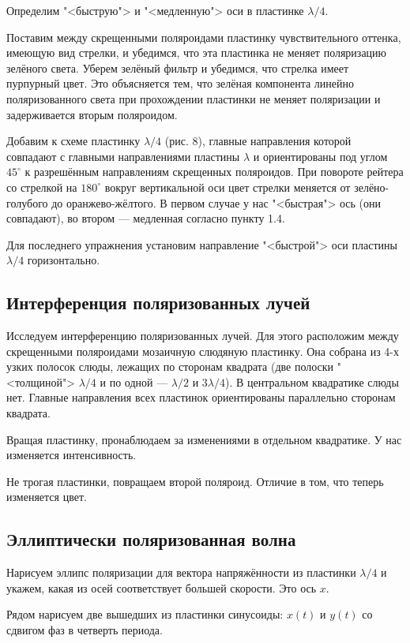 \documentclass[12pt]{kiarticle}
\begin{document}
Определим "<быструю"> и "<медленную"> оси в пластинке $ \lambda/4 $.

Поставим между скрещенными поляроидами пластинку чувствительного оттенка, имеющую вид стрелки, и убедимся, что эта пластинка не меняет поляризацию зелёного света. Уберем зелёный фильтр и убедимся, что стрелка имеет пурпурный
цвет. Это объясняется тем, что зелёная компонента линейно поляризованного света при прохождении пластинки не меняет поляризации и задерживается вторым поляроидом.

Добавим к схеме пластинку $ \lambda/4 $
(рис. 8), главные направления которой совпадают с главными направлениями пластины $ \lambda $ и ориентированы
под углом $ 45^\circ $ к разрешённым направлениям скрещенных поляроидов.
При повороте рейтера со стрелкой на $ 180^\circ $ вокруг вертикальной оси
цвет стрелки меняется от зелёно-голубого до оранжево-жёлтого. В первом случае у нас "<быстрая"> ось (они совпадают), во втором --- медленная согласно пункту 1.4.

Для последнего упражнения установим направление "<быстрой"> оси пластины $ \lambda/4 $ горизонтально.

\subsection{Интерференция поляризованных лучей}

Исследуем интерференцию поляризованных лучей. Для этого расположим между скрещенными поляроидами мозаичную слюдяную пластинку. Она собрана из 4-х узких полосок слюды, лежащих по сторонам
квадрата (две полоски "<толщиной"> $ \lambda/4 $ и по одной --- $ \lambda/2 $ и $ 3\lambda/4 $). В центральном квадратике слюды нет. Главные направления всех пластинок ориентированы параллельно сторонам квадрата.

Вращая пластинку, пронаблюдаем за изменениями в отдельном квадратике. У нас изменяется интенсивность. 

Не трогая пластинки, повращаем второй поляроид. Отличие в том, что теперь изменяется цвет.

\subsection{Эллиптически поляризованная волна}

Нарисуем эллипс поляризации для вектора напряжённости из пластинки $ \lambda/4 $ и укажем, какая из осей соответствует большей скорости. Это ось $ x $.

Рядом нарисуем две вышедших из пластинки синусоиды: $ x(t) $ и $ y(t) $ со сдвигом фаз в четверть периода. 
\end{document}
